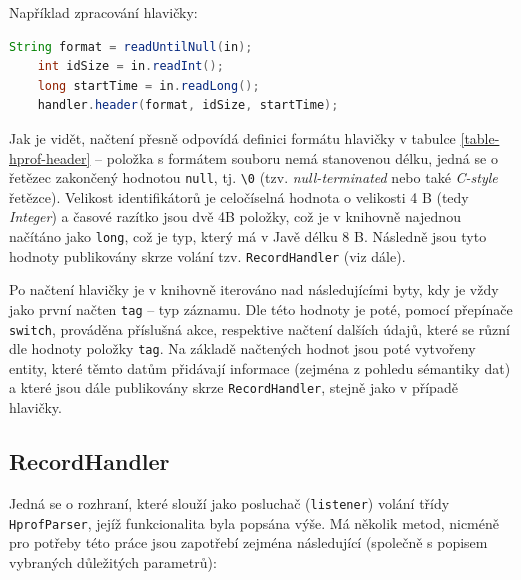 Například zpracování hlavičky:

\begin{lstlisting}[caption={Příklad zpracování hlavičky ze souboru HPROF}, frame={single}, language={java}, float,floatplacement=H]
    String format = readUntilNull(in);
    int idSize = in.readInt();
    long startTime = in.readLong();
    handler.header(format, idSize, startTime);
\end{lstlisting}

Jak je vidět, načtení přesně odpovídá definici formátu hlavičky v tabulce \ref{table-hprof-header} -- položka s formátem souboru nemá stanovenou délku, jedná se o řetězec zakončený hodnotou \texttt{null}, tj. \texttt{\textbackslash0} (tzv. \textit{null-terminated} nebo také \textit{C-style} řetězce). Velikost identifikátorů je celočíselná hodnota o velikosti 4 B (tedy \textit{Integer}) a časové razítko jsou dvě 4B položky, což je v knihovně najednou načítáno jako \texttt{long}, což je typ, který má v Javě délku 8 B. Následně jsou tyto hodnoty publikovány skrze volání tzv. \texttt{RecordHandler} (viz dále).

Po načtení hlavičky je v knihovně iterováno nad následujícími byty, kdy je vždy jako první načten \texttt{tag} -- typ záznamu. Dle této hodnoty je poté, pomocí přepínače \texttt{switch}, prováděna příslušná akce, respektive načtení dalších údajů, které se různí dle hodnoty položky \texttt{tag}. Na základě načtených hodnot jsou poté vytvořeny entity, které těmto datům přidávají informace (zejména z pohledu sémantiky dat) a které jsou dále publikovány skrze \texttt{RecordHandler}, stejně jako v případě hlavičky.

\subsection{RecordHandler}
\label{hprof-lib-recordhandler}
Jedná se o rozhraní, které slouží jako posluchač (\texttt{listener}) volání třídy \texttt{HprofParser}, jejíž funkcionalita byla popsána výše. Má několik metod, nicméně pro potřeby této práce jsou zapotřebí zejména následující (společně s popisem vybraných důležitých parametrů):

